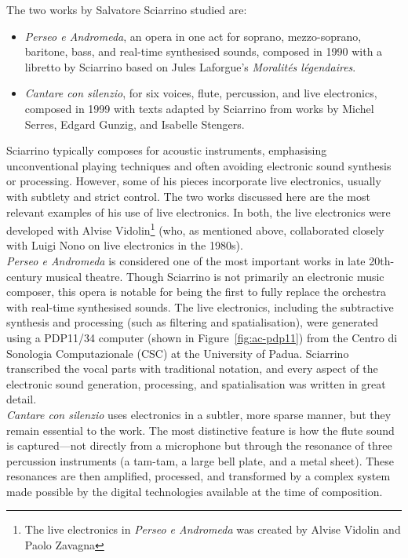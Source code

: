 \newline
The two works by Salvatore Sciarrino studied are:
\begin{itemize}
    \item \textit{Perseo e Andromeda}, an opera in one act for soprano, mezzo-soprano, baritone, bass, and real-time synthesised sounds, composed in 1990 with a libretto by Sciarrino based on Jules Laforgue’s \textit{Moralités légendaires}.
    \item \textit{Cantare con silenzio}, for six voices, flute, percussion, and live electronics, composed in 1999 with texts adapted by Sciarrino from works by Michel Serres, Edgard Gunzig, and Isabelle Stengers.
\end{itemize}
Sciarrino typically composes for acoustic instruments, emphasising unconventional playing techniques and often avoiding electronic sound synthesis or processing. However, some of his pieces incorporate live electronics, usually with subtlety and strict control. The two works discussed here are the most relevant examples of his use of live electronics. In both, the live electronics were developed with Alvise Vidolin\footnote{The live electronics in \textit{Perseo e Andromeda} was created by Alvise Vidolin and Paolo Zavagna} (who, as mentioned above, collaborated closely with Luigi Nono on live electronics in the 1980s).\\
\textit{Perseo e Andromeda} is considered one of the most important works in late 20th-century musical theatre. Though Sciarrino is not primarily an electronic music composer, this opera is notable for being the first to fully replace the orchestra with real-time synthesised sounds. The live electronics, including the subtractive synthesis and processing (such as filtering and spatialisation), were generated using a PDP11/34 computer (shown in Figure~\ref{fig:ac-pdp11}) from the Centro di Sonologia Computazionale (CSC) at the University of Padua. Sciarrino transcribed the vocal parts with traditional notation, and every aspect of the electronic sound generation, processing, and spatialisation was written in great detail.\\
\textit{Cantare con silenzio} uses electronics in a subtler, more sparse manner, but they remain essential to the work. The most distinctive feature is how the flute sound is captured—not directly from a microphone but through the resonance of three percussion instruments (a tam-tam, a large bell plate, and a metal sheet). These resonances are then amplified, processed, and transformed by a complex system made possible by the digital technologies available at the time of composition.\\

